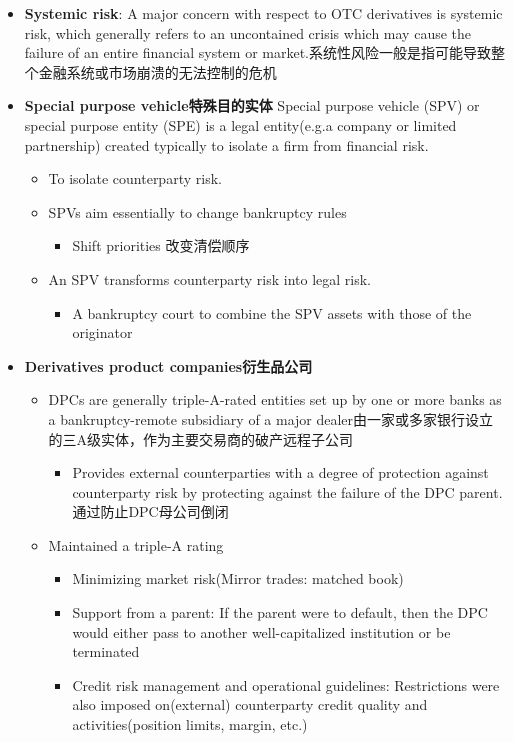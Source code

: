 \begin{itemize}
    \item \textbf{Systemic risk}: A major concern with respect to OTC
    derivatives is systemic risk, which generally refers to an
    uncontained crisis which may cause the failure of an entire financial system or market.系统性风险一般是指可能导致整
    个金融系统或市场崩溃的无法控制的危机
    \item \textbf{Special purpose vehicle特殊目的实体}
    Special purpose vehicle (SPV) or special purpose entity (SPE) is a legal entity(e.g.a company or limited partnership) created typically to isolate a firm from financial risk.
    \begin{itemize}
        \item To isolate counterparty risk.
        \item SPVs aim essentially to change bankruptcy rules
        \begin{itemize}
            \item Shift priorities 改变清偿顺序
        \end{itemize}
        \item An SPV transforms counterparty risk into legal risk.
        \begin{itemize}
            \item A bankruptcy court to combine the SPV assets with those of the originator
        \end{itemize}   
    \end{itemize}
   \item \textbf{Derivatives product companies衍生品公司}
   \begin{itemize}
    \item DPCs are generally triple-A-rated entities set up by one or more banks as a bankruptcy-remote subsidiary of a major dealer由一家或多家银行设立的三A级实体，作为主要交易商的破产远程子公司
    \begin{itemize}
   \item Provides external counterparties with a degree of
   protection against counterparty risk by protecting against
   the failure of the DPC parent.通过防止DPC母公司倒闭
\end{itemize}

\item Maintained a triple-A rating
\begin{itemize}
    \item Minimizing market risk(Mirror trades: matched book)
    \item Support from a parent: If the parent were to default, then the DPC would either pass to another well-capitalized institution or be terminated
    \item Credit risk management and operational guidelines:
    Restrictions were also imposed on(external) counterparty
    credit quality and activities(position limits, margin, etc.)
\end{itemize}


\end{itemize}
\end{itemize}
